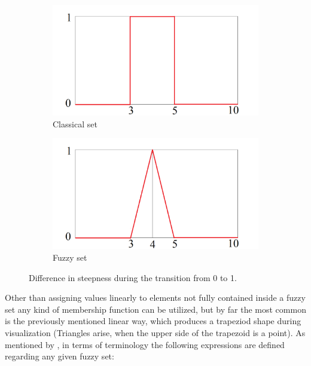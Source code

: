 \begin{figure}[!h]
\centering
\begin{subfigure}{.5\textwidth}
	\centering
	\includegraphics[width=1\textwidth]{images/classic}
  	\caption{Classical set}
  	\label{fig:classical}
\end{subfigure}%
\begin{subfigure}{.5\textwidth}
	\centering
  	\includegraphics[width=1\textwidth]{images/fuzzy}
  	\caption{Fuzzy set}
  	\label{fig:fuzzy}
\end{subfigure}
\caption{Difference in steepness during the transition from 0 to 1.}
\label{fig:steepness}
\end{figure}

Other than assigning values linearly to elements not fully contained inside a fuzzy set any kind of membership function can be utilized, but by far the most common is the previously mentioned linear way, which produces a trapeziod shape during visualization (Triangles arise, when the upper side of the trapezoid is a point). As mentioned by \cite{sabri2013}, in terms of terminology the following expressions are defined regarding any given fuzzy set:

